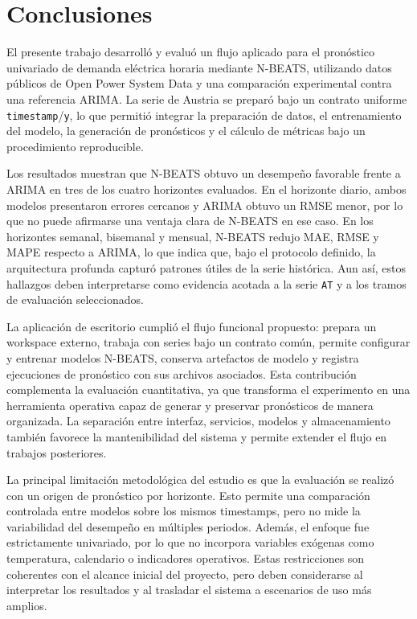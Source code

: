 \section{Conclusiones}

El presente trabajo desarrolló y evaluó un flujo aplicado para el pronóstico univariado de demanda eléctrica horaria mediante N-BEATS, utilizando datos públicos de Open Power System Data y una comparación experimental contra una referencia ARIMA. La serie de Austria se preparó bajo un contrato uniforme \texttt{timestamp}/\texttt{y}, lo que permitió integrar la preparación de datos, el entrenamiento del modelo, la generación de pronósticos y el cálculo de métricas bajo un procedimiento reproducible.

Los resultados muestran que N-BEATS obtuvo un desempeño favorable frente a ARIMA en tres de los cuatro horizontes evaluados. En el horizonte diario, ambos modelos presentaron errores cercanos y ARIMA obtuvo un RMSE menor, por lo que no puede afirmarse una ventaja clara de N-BEATS en ese caso. En los horizontes semanal, bisemanal y mensual, N-BEATS redujo MAE, RMSE y MAPE respecto a ARIMA, lo que indica que, bajo el protocolo definido, la arquitectura profunda capturó patrones útiles de la serie histórica. Aun así, estos hallazgos deben interpretarse como evidencia acotada a la serie \texttt{AT} y a los tramos de evaluación seleccionados.

La aplicación de escritorio cumplió el flujo funcional propuesto: prepara un workspace externo, trabaja con series bajo un contrato común, permite configurar y entrenar modelos N-BEATS, conserva artefactos de modelo y registra ejecuciones de pronóstico con sus archivos asociados. Esta contribución complementa la evaluación cuantitativa, ya que transforma el experimento en una herramienta operativa capaz de generar y preservar pronósticos de manera organizada. La separación entre interfaz, servicios, modelos y almacenamiento también favorece la mantenibilidad del sistema y permite extender el flujo en trabajos posteriores.

La principal limitación metodológica del estudio es que la evaluación se realizó con un origen de pronóstico por horizonte. Esto permite una comparación controlada entre modelos sobre los mismos timestamps, pero no mide la variabilidad del desempeño en múltiples periodos. Además, el enfoque fue estrictamente univariado, por lo que no incorpora variables exógenas como temperatura, calendario o indicadores operativos. Estas restricciones son coherentes con el alcance inicial del proyecto, pero deben considerarse al interpretar los resultados y al trasladar el sistema a escenarios de uso más amplios.

